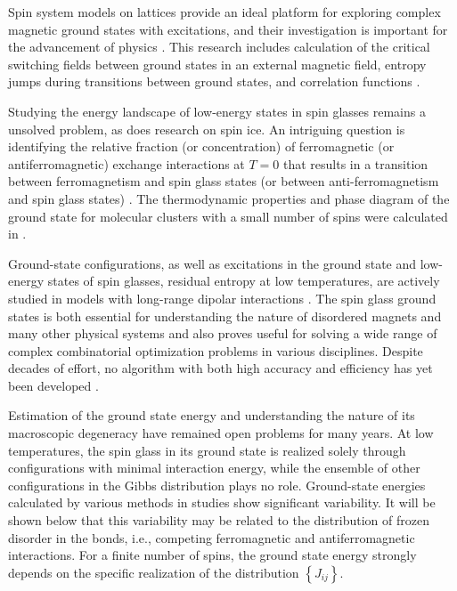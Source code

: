 \documentclass[preprint,12pt]{elsarticle}
\begin{document}
	Spin system models on lattices provide an ideal platform for exploring complex magnetic ground states with excitations, and their investigation is important for the advancement of physics \cite{lacroix2011introduction}. This research includes calculation of the critical switching fields between ground states in an external magnetic field, entropy jumps during transitions between ground states, and correlation functions \cite{ramirez2004effect, rosas2004random, andriushchenko2019large}.  
	
	Studying the energy landscape of low-energy states in spin glasses \cite{biswas2023energy} remains a unsolved problem, as does research on spin ice. An intriguing question is identifying the relative fraction (or concentration) of ferromagnetic (or antiferromagnetic) exchange interactions at $T=0$ that results in a transition between ferromagnetism and spin glass states (or between anti-ferromagnetism and spin glass states) \cite{gruzberg2001random, honecker2001universality, picco2006strong, tsomokos2011interplay, zimmer2022role}. The thermodynamic properties and phase diagram of the ground state for molecular clusters with a small number of spins were calculated in \cite{dias2023ground}.
	
	Ground-state configurations, as well as excitations in the ground state and low-energy states of spin glasses, residual entropy at low temperatures, are actively studied in models with long-range dipolar interactions \cite{makarova2021low, singh2024micromagnetic}. The spin glass ground states is both essential for understanding the nature of disordered magnets and many other physical systems and also proves useful for solving a wide range of complex combinatorial optimization problems in various disciplines. Despite decades of effort, no algorithm with both high accuracy and efficiency has yet been developed \cite{fan2023searching}.  
	
	Estimation of the ground state energy and understanding the nature of its macroscopic degeneracy have remained open problems for many years. At low temperatures, the spin glass in its ground state is realized solely through configurations with minimal interaction energy, while the ensemble of other configurations in the Gibbs distribution plays no role. Ground-state energies calculated by various methods in studies \cite{thouless1977solution, sherrington1975solvable, tanaka1980analytic, klein1976comparison, kirkpatrick1978infinite, karandashev2019global, palmer1999ground, campbell2004energy, roma2009ground} show significant variability. It will be shown below that this variability may be related to the distribution of frozen disorder in the bonds, i.e., competing ferromagnetic and antiferromagnetic interactions. For a finite number of spins, the ground state energy strongly depends on the specific realization of the distribution $\left\lbrace J_{ij} \right\rbrace$.  
	
\end{document}
